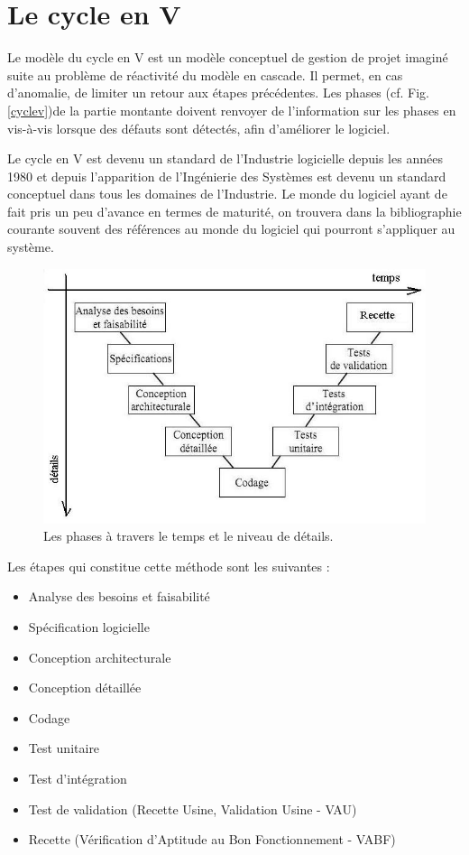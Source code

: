 \section{Le cycle en V}
Le modèle du cycle en V est un modèle conceptuel de gestion de projet imaginé suite au problème de réactivité du modèle en cascade. Il permet, en cas d'anomalie, de limiter un retour aux étapes précédentes. Les phases (cf. Fig. \vref{cyclev})de la partie montante doivent renvoyer de l'information sur les phases en vis-à-vis lorsque des défauts sont détectés, afin d'améliorer le logiciel.

Le cycle en V est devenu un standard de l'Industrie logicielle depuis les années 1980 et depuis l'apparition de l'Ingénierie des Systèmes est devenu un standard conceptuel dans tous les domaines de l'Industrie. Le monde du logiciel ayant de fait pris un peu d'avance en termes de maturité, on trouvera dans la bibliographie courante souvent des références au monde du logiciel qui pourront s'appliquer au système.
\begin{figure}
\center
\includegraphics[width=12cm]{images/cyclev.png}
\caption{Les phases à travers le temps et le niveau de détails.}
\label{cyclev}
\end{figure}

Les étapes qui constitue cette méthode sont les suivantes :
\begin{itemize}
    \item Analyse des besoins et faisabilité
    \item Spécification logicielle
    \item Conception architecturale
    \item Conception détaillée
    \item Codage
    \item Test unitaire
    \item Test d'intégration
    \item Test de validation (Recette Usine, Validation Usine - VAU)
    \item Recette (Vérification d'Aptitude au Bon Fonctionnement - VABF)
\end{itemize}

